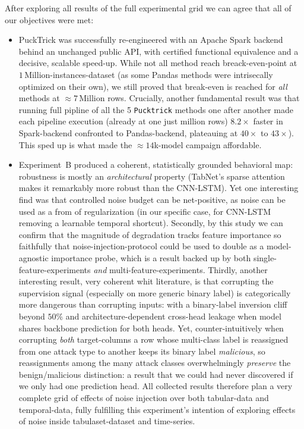 \documentclass[a4paper, 9pt]{extarticle}
\begin{document}
After exploring all results of the full experimental grid we can agree that all of our objectives were met:
\begin{itemize}
    \item PuckTrick was successfully re-engineered with an Apache Spark backend behind an unchanged public API, with certified functional equivalence and a decisive, scalable speed-up. 
    While not all method reach breack-even-point at $1\,$Million-instances-dataset (as some Pandas methods were intrisecally optimized on their own), we still proved that break-even is reached for \emph{all} methods at $\approx7\,$Million rows. Crucially, another fundamental result was that running full pipline of all the 5 \texttt{Pucktrick} methods one after another made each pipeline execution (already at one just million rows) $8.2\times$ faster in Spark-backend confronted to Pandas-backend, plateauing at $40\times$ to $43\times$). This sped up is what made the $\approx 14$k-model campaign affordable.

    \item Experiment~B produced a coherent, statistically grounded behavioral map: robustness is mostly an \emph{architectural} property (TabNet's sparse attention makes it remarkably more robust than the CNN-LSTM). Yet one interesting find was that controlled noise budget can be net-positive, as noise can be used as a from of regularization (in our specific case, for CNN-LSTM removing a learnable temporal shortcut). Secondly, by this study we can confirm that the magnitude of degradation tracks feature importance so faithfully that noise-injection-protocol could be used to double as a model-agnostic importance probe, which is a result backed up by both single-feature-experiments \emph{and} multi-feature-experiments. Thirdly, another interesting result, very coherent whit literature, is that corrupting the supervision signal (especially on more generic binary label) is categorically more dangerous than corrupting inputs: with a binary-label inversion cliff beyond $50\%$ and architecture-dependent cross-head leakage when model shares backbone prediction for both heads. Yet, counter-intuitively when corrupting \emph{both} target-columns a row whose multi-class label is reassigned from one attack type to another keeps its binary label \emph{malicious}, so reassignments among the many attack classes overwhelmingly \emph{preserve} the benign/malicious distinction: a result that we could had never discovered if we only had one prediction head. All collected results therefore plan a very complete grid of effects of noise injection over both tabular-data and temporal-data, fully fulfilling this experiment's intention of exploring effects of noise inside tabulaset-dataset and time-series. 
    

\end{itemize}
\end{document}
